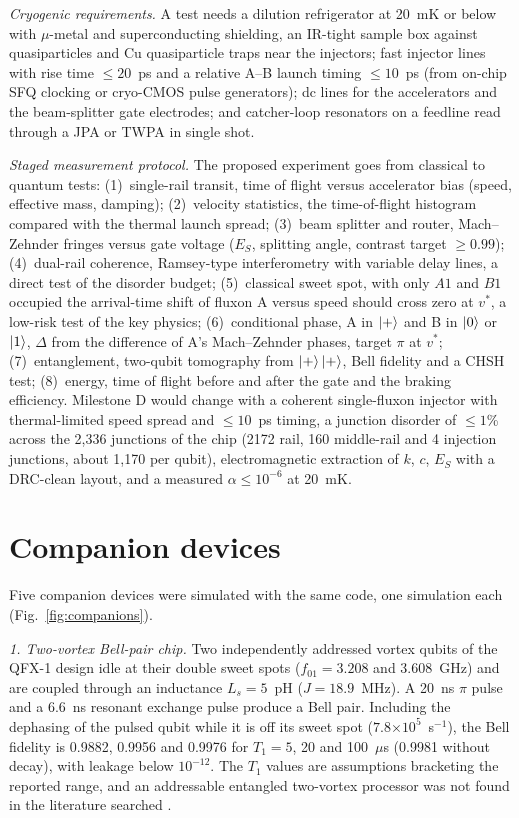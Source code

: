 \documentclass[10pt,twocolumn,letterpaper]{article}
\newcommand{\ee}[1]{\ensuremath{\times10^{#1}}}
\begin{document}
\emph{Cryogenic requirements.} A test needs a dilution refrigerator at 20~mK or below with $\mu$-metal and
superconducting shielding, an IR-tight sample box against quasiparticles and Cu quasiparticle traps near the
injectors; fast injector lines with rise time $\le20$~ps and a relative A--B launch timing $\le10$~ps (from on-chip
SFQ clocking or cryo-CMOS pulse generators); dc lines for the accelerators and the beam-splitter gate electrodes; and
catcher-loop resonators on a feedline read through a JPA or TWPA in single shot.

\emph{Staged measurement protocol.} The proposed experiment goes from classical to quantum tests:
(1)~single-rail transit, time of flight versus accelerator bias (speed, effective mass, damping); (2)~velocity
statistics, the time-of-flight histogram compared with the thermal launch spread; (3)~beam splitter and router,
Mach--Zehnder fringes versus gate voltage ($E_S$, splitting angle, contrast target $\ge0.99$); (4)~dual-rail coherence,
Ramsey-type interferometry with variable delay lines, a direct test of the disorder budget; (5)~classical sweet spot,
with only $A1$ and $B1$ occupied the arrival-time shift of fluxon A versus speed should cross zero at $v^*$, a
low-risk test of the key physics; (6)~conditional phase, A in $\ket{+}$ and B in $\ket{0}$ or $\ket{1}$, $\Delta$ from
the difference of A's Mach--Zehnder phases, target $\pi$ at $v^*$; (7)~entanglement, two-qubit tomography from
$\ket{+}\ket{+}$, Bell fidelity and a CHSH test; (8)~energy, time of flight before and after the gate and the braking
efficiency. Milestone D would change with a coherent single-fluxon injector with thermal-limited speed spread and
$\le10$~ps timing, a junction disorder of $\le1$\% across the 2,336 junctions of the chip (2172 rail, 160
middle-rail and 4 injection junctions, about 1,170 per qubit), electromagnetic extraction of $k$, $c$, $E_S$ with a DRC-clean layout, and a measured $\alpha\le10^{-6}$ at
20~mK.

\section{Companion devices}
\label{sec:companions}

Five companion devices were simulated with the same code, one simulation each (Fig.~\ref{fig:companions}).

\emph{1. Two-vortex Bell-pair chip.} Two independently addressed vortex qubits of the QFX-1 design idle at their double
sweet spots ($f_{01}=3.208$ and 3.608~GHz) and are coupled through an inductance $L_s=5$~pH ($J=18.9$~MHz). A
20~ns $\pi$ pulse and a 6.6~ns resonant exchange pulse produce a Bell pair. Including the dephasing of the pulsed qubit
while it is off its sweet spot ($7.8\ee{5}$~s$^{-1}$), the Bell fidelity is 0.9882, 0.9956 and 0.9976 for $T_1=5$, 20 and
100~$\mu$s (0.9981 without decay), with leakage below $10^{-12}$. The $T_1$ values are assumptions bracketing the reported range, and an
addressable entangled two-vortex processor was not found in the literature searched \cite{Nambisan2026}.
\end{document}
